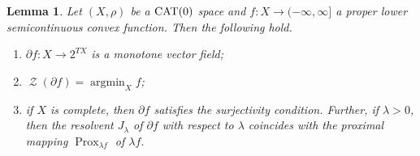\documentclass[draft]{amsart}
\numberwithin{equation}{section}
\DeclareMathOperator*{\Argmin}{argmin}
\DeclareMathOperator{\Prox}{Prox}
\DeclareMathOperator{\Zer}{\mathcal{Z}}
\newcommand{\CAT}{\textup{CAT}}
\theoremstyle{plain}
\newtheorem{lemma}[theorem]{Lemma}
\theoremstyle{definition}
\theoremstyle{remark}
\begin{document}
\begin{lemma}\label{lem:prox}
 Let $(X, \rho)$ be a $\CAT(0)$ space and 
 $f\colon X\to (-\infty, \infty]$ a proper lower semicontinuous 
 convex function. 
 Then the following hold. 
 \begin{enumerate}
  \item[(i)] $\partial f\colon X\to 2^{TX}$ is a monotone vector field; 
  \item[(ii)] $\Zer (\partial f)=\Argmin_X f$; 
  \item[(iii)] if $X$ is complete, 
 then $\partial f$ satisfies the surjectivity condition. 
 Further, if $\lambda >0$,  then 
 the resolvent $J_{\lambda}$ of $\partial f$ with respect to 
 $\lambda$ coincides with 
 the proximal mapping $\Prox_{\lambda f}$ of $\lambda f$. 
 \end{enumerate}
\end{lemma}
\end{document}
